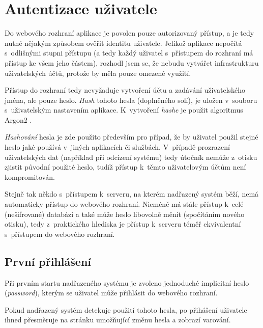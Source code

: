 \section{Autentizace uživatele}
\label{sec:de_auth}

Do webového rozhraní aplikace je povolen pouze autorizovaný přístup, a je tedy nutné nějakým způsobem ověřit identitu uživatele. Jelikož aplikace nepočítá s~odlišnými stupni přístupu (a tedy každý uživatel s~přístupem do rozhraní má přístup ke všem jeho částem), rozhodl jsem se, že nebudu vytvářet infrastrukturu uživatelských účtů, protože by měla pouze omezené využití.

Přístup do rozhraní tedy nevyžaduje vytvoření účtu a zadávání uživatelského jména, ale pouze heslo. \textit{Hash} tohoto hesla (doplněného solí), je uložen v~souboru s~uživatelským nastavením aplikace. K~vytvoření \textit{hashe} je použit algoritmus Argon2 \cite{argon2}.

\textit{Hashování} hesla je zde použito především pro případ, že by uživatel použil stejné heslo jaké používá v~jiných aplikacích či službách. V~případě prozrazení uživatelských dat (například při odcizení systému) tedy útočník nemůže z~otisku zjistit původní použité heslo, tudíž přístup k~těmto uživatelovým účtům není kompromitován.

Stejně tak někdo s~přístupem k~serveru, na kterém nadřazený systém běží, nemá automaticky přístup do webového rozhraní. Nicméně má stále přístup k~celé (nešifrované) databázi a také může heslo libovolně měnit (spočítáním nového otisku), tedy z~praktického hlediska je přístup k~serveru téměř ekvivalentní s~přístupem do webového rozhraní.

\subsection{První přihlášení}

Při prvním startu nadřazeného systému je zvoleno jednoduché implicitní heslo (\textit{password}), kterým se uživatel může přihlásit do webového rozhraní. 

Pokud nadřazený systém detekuje použití tohoto hesla, po přihášení uživatele ihned přesměruje na stránku umožňující změnu hesla a zobrazí varování.